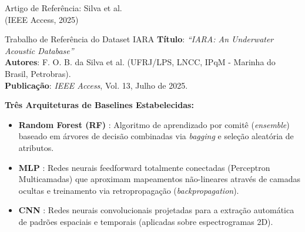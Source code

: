 \documentclass{beamer}
\begin{document}
\begin{frame}{Artigo de Referência: Silva et al.\\ (IEEE Access, 2025)}
    \small
    \begin{block}{Trabalho de Referência do Dataset IARA}
        \textbf{Título}: \textit{``IARA: An Underwater Acoustic Database''}\\
        \textbf{Autores}: F. O. B. da Silva et al. (UFRJ/LPS, LNCC, IPqM - Marinha do Brasil, Petrobras).\\
        \textbf{Publicação}: \textit{IEEE Access}, Vol. 13, Julho de 2025.
    \end{block}
    
    \vspace{0.2cm}
    
    \footnotesize
    \textbf{Três Arquiteturas de Baselines Estabelecidas:}
    \begin{itemize}
        \item \textbf{Random Forest (RF)} \cite{breiman2001}: Algoritmo de aprendizado por comitê (\textit{ensemble}) baseado em árvores de decisão combinadas via \textit{bagging} e seleção aleatória de atributos.
        \item \textbf{MLP} \cite{rumelhart1986}: Redes neurais feedforward totalmente conectadas (Perceptron Multicamadas) que aproximam mapeamentos não-lineares através de camadas ocultas e treinamento via retropropagação (\textit{backpropagation}).
        \item \textbf{CNN} \cite{lecun1998}: Redes neurais convolucionais projetadas para a extração automática de padrões espaciais e temporais (aplicadas sobre espectrogramas 2D).
    \end{itemize}
\end{frame}
\end{document}
